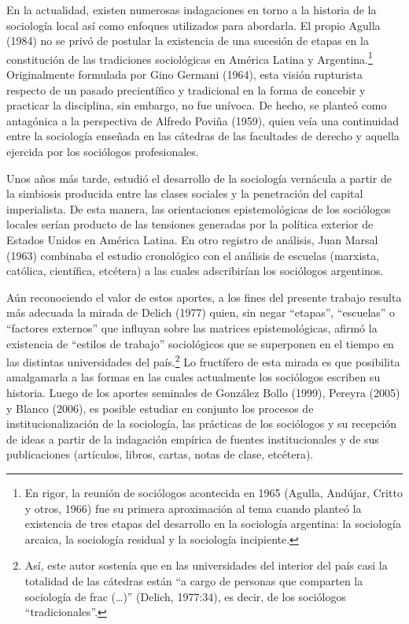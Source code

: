 En la actualidad, existen numerosas indagaciones en torno a la historia de la sociología local así como enfoques utilizados para abordarla. El propio Agulla (1984) no se privó de postular la existencia de una sucesión de etapas en la constitución de las tradiciones sociológicas en América Latina y Argentina.\footnote{En rigor, la reunión de sociólogos acontecida en 1965 (Agulla, Andújar, Critto y otros, 1966) fue su primera aproximación al tema cuando planteó la existencia de tres etapas del desarrollo en la sociología argentina: la sociología arcaica, la sociología residual y la sociología incipiente.} Originalmente formulada por Gino Germani (1964), esta visión rupturista respecto de un pasado precientífico y tradicional en la forma de concebir y practicar la disciplina, sin embargo, no fue unívoca. De hecho, se planteó como antagónica a la perspectiva de Alfredo Poviña (1959), quien veía una continuidad entre la sociología enseñada en las cátedras de las facultades de derecho y aquella ejercida por los sociólogos profesionales.

Unos años más tarde, \textcite{1450-VERON1974} estudió el desarrollo de la sociología vernácula a partir de la simbiosis producida entre las clases sociales y la penetración del capital imperialista. De esta manera, las orientaciones epistemológicas de los sociólogos locales serían producto de las tensiones generadas por la política exterior de Estados Unidos en América Latina. En otro registro de análisis, Juan Marsal (1963) combinaba el estudio cronológico con el análisis de escuelas (marxista, católica, científica, etcétera) a las cuales adscribirían los sociólogos argentinos.

Aún reconociendo el valor de estos aportes, a los fines del presente trabajo resulta más adecuada la mirada de Delich (1977) quien, sin negar ``etapas'', ``escuelas'' o ``factores externos'' que influyan sobre las matrices epistemológicas, afirmó la existencia de ``estilos de trabajo'' sociológicos que se superponen en el tiempo en las distintas universidades del país.\footnote{Así, este autor sostenía que en las universidades del interior del país casi la totalidad de las cátedras están ``a cargo de personas que comparten la sociología de frac (\dots)'' (Delich, 1977:34), es decir, de los sociólogos ``tradicionales''.} Lo fructífero de esta mirada es que posibilita amalgamarla a las formas en las cuales actualmente los sociólogos escriben su historia. Luego de los aportes seminales de González Bollo (1999), Pereyra (2005) y Blanco (2006), es posible estudiar en conjunto los procesos de institucionalización de la sociología, las prácticas de los sociólogos y su recepción de ideas a partir de la indagación empírica de fuentes institucionales y de sus publicaciones (artículos, libros, cartas, notas de clase, etcétera).

